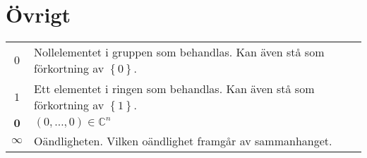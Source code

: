 \section{Övrigt}

\begin{tabular}{cp{10.5cm}}
$0$ & Nollelementet i gruppen som behandlas. Kan även stå som förkortning
av $\left\lbrace 0\right\rbrace$. \\
$1$ & Ett elementet i ringen som behandlas. Kan även stå som förkortning
av $\left\lbrace 1\right\rbrace$. \\
$\mathbf{0}$ & $\left(0, \ldots , 0\right) \in \mathbb{C} ^n$ \\
$\infty$ & Oändligheten. Vilken oändlighet framgår av sammanhanget. \\
\end{tabular}
